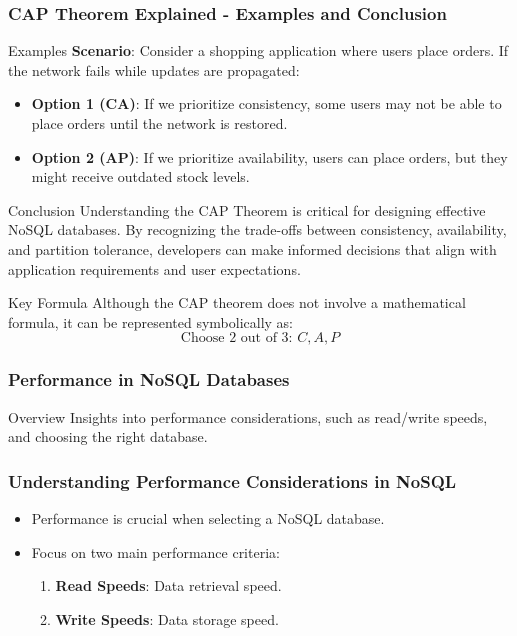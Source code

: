 \documentclass[aspectratio=169]{beamer}
\begin{document}
\begin{frame}[fragile]
  \frametitle{CAP Theorem Explained - Examples and Conclusion}
  \begin{block}{Examples}
    \textbf{Scenario}: Consider a shopping application where users place orders. If the network fails while updates are propagated:
    \begin{itemize}
      \item \textbf{Option 1 (CA)}: If we prioritize consistency, some users may not be able to place orders until the network is restored.
      \item \textbf{Option 2 (AP)}: If we prioritize availability, users can place orders, but they might receive outdated stock levels.
    \end{itemize}
  \end{block}

  \begin{block}{Conclusion}
    Understanding the CAP Theorem is critical for designing effective NoSQL databases. By recognizing the trade-offs between consistency, availability, and partition tolerance, developers can make informed decisions that align with application requirements and user expectations.
  \end{block}

  \begin{block}{Key Formula}
    Although the CAP theorem does not involve a mathematical formula, it can be represented symbolically as:
    \[
    \text{Choose 2 out of 3: } C, A, P 
    \]
  \end{block}
\end{frame}

\begin{frame}[fragile]
    \frametitle{Performance in NoSQL Databases}
    \begin{block}{Overview}
        Insights into performance considerations, such as read/write speeds, and choosing the right database.
    \end{block}
\end{frame}

\begin{frame}[fragile]
    \frametitle{Understanding Performance Considerations in NoSQL}
    \begin{itemize}
        \item Performance is crucial when selecting a NoSQL database.
        \item Focus on two main performance criteria:
            \begin{enumerate}
                \item \textbf{Read Speeds}: Data retrieval speed.
                \item \textbf{Write Speeds}: Data storage speed.
            \end{enumerate}
    \end{itemize}
\end{frame}
\end{document}
